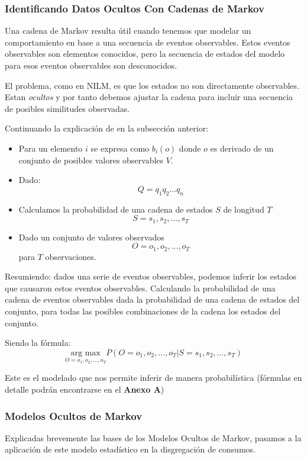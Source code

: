 \subsubsection{Identificando Datos Ocultos Con Cadenas de Markov}
Una cadena de Markov resulta útil cuando tenemos que modelar un comportamiento en base a una secuencia de eventos observables. 
Estos eventos observables son elementos conocidos, pero la secuencia de estados del modelo para esos eventos observables son desconocidos. 

El problema, como en NILM, es que los estados no son directamente observables. Estan \textit{ocultos} y por tanto debemos ajustar la cadena para incluir una secuencia de posibles similitudes observadas. 

Continuando la explicación de \autocite{markovStandford} en la subsección anterior:
\begin{center}
    \begin{itemize}
        \item Para un elemento $i$ se expresa como $b_i(o)$ donde $o$ es derivado de un conjunto de posibles valores observables $V$.

        \item Dado: $$Q = q_1q_2...q_n$$ 
        \item Calculamos la probabilidad de una cadena de estados $S$ de longitud $T$ $$S=s_1,s_2,...,s_{T}$$
        \item Dado un conjunto de valores observados $$O=o_1,o_2,...,o_{T}$$ para ${T}$ observaciones.
\end{itemize} 
\end{center}

Resumiendo: dados una serie de eventos observables, podemos inferir los estados que causaron estos eventos observables. Calculando la probabilidad de una cadena de eventos observables dada la probabilidad de una cadena de estados del conjunto, para todas las posibles combinaciones de la cadena los estados del conjunto. 

Siendo la fórmula:
$$
\underset{O=o_1,o_2,...,o_{T}}{\text{arg max}} P (O=o_1,o_2,...,o_{T} | S=s_1,s_2,...,s_{T})
$$

Este es el modelado que nos permite inferir de manera probabilística (fórmulas en detalle podrán encontrarse en el \textbf{Anexo A})

\subsubsection{Modelos Ocultos de Markov}
Explicadas brevemente las bases de los Modelos Ocultos de Markov, pasamos a la aplicación de este modelo estadístico en la disgregación de consumos.

